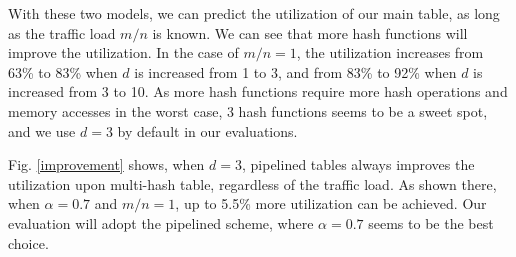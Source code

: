 With these two models, we can predict the utilization of our main table, 
as long as the traffic load $m/n$ is known.
We can see that more hash functions will improve the utilization.
In the case of $m/n=1$, the utilization  increases from 63\% to 83\% 
when $d$ is increased from 1 to 3, and from 83\% to 92\% when $d$ is increased from 3 to 10.
As more hash functions require more hash operations and memory accesses in the worst case, 3 hash functions seems to be a  sweet spot, and we use $d=3$ by default in our evaluations.

Fig. \ref{improvement} shows, when $d=3$, 
pipelined tables always improves the utilization upon  multi-hash table, regardless of the traffic load.
As shown there, when $\alpha=0.7$ and $m/n=1$, up to 5.5\% more utilization can be achieved.
Our evaluation will adopt the pipelined scheme, where $\alpha=0.7$ seems to be the best choice.


